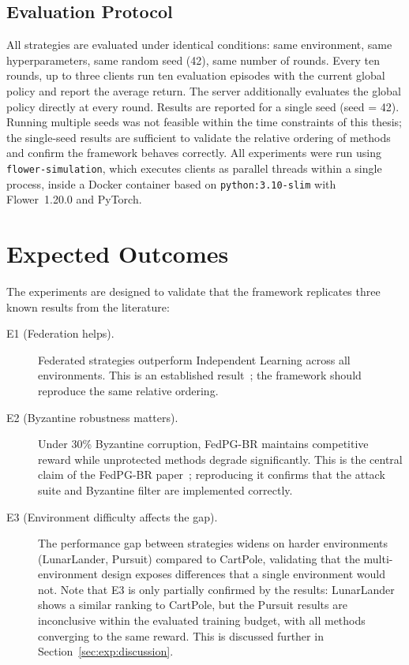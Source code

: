\documentclass[a4paper, oneside]{discothesis}
\begin{document}
\subsection{Evaluation Protocol}

All strategies are evaluated under identical conditions: same environment, same hyperparameters, same random seed (42), same number of rounds. Every ten rounds, up to three clients run ten evaluation episodes with the current global policy and report the average return. The server additionally evaluates the global policy directly at every round. Results are reported for a single seed (seed = 42). Running multiple seeds was not feasible within the time constraints of this thesis; the single-seed results are sufficient to validate the relative ordering of methods and confirm the framework behaves correctly. All experiments were run using \texttt{flower-simulation}, which executes clients as parallel threads within a single process, inside a Docker container based on \texttt{python:3.10-slim} with Flower~1.20.0 and PyTorch.

\section{Expected Outcomes}
\label{sec:exp:outcomes}

The experiments are designed to validate that the framework replicates three known results from the literature:

\begin{description}
    \item[E1 (Federation helps).] Federated strategies outperform Independent Learning across all environments. This is an established result~\cite{FedPGBR}; the framework should reproduce the same relative ordering.

    \item[E2 (Byzantine robustness matters).] Under 30\% Byzantine corruption, FedPG-BR maintains competitive reward while unprotected methods degrade significantly. This is the central claim of the FedPG-BR paper~\cite{FedPGBR}; reproducing it confirms that the attack suite and Byzantine filter are implemented correctly.

    \item[E3 (Environment difficulty affects the gap).] The performance gap between strategies widens on harder environments (LunarLander, Pursuit) compared to CartPole, validating that the multi-environment design exposes differences that a single environment would not. Note that E3 is only partially confirmed by the results: LunarLander shows a similar ranking to CartPole, but the Pursuit results are inconclusive within the evaluated training budget, with all methods converging to the same reward. This is discussed further in Section~\ref{sec:exp:discussion}.
\end{description}
\end{document}
